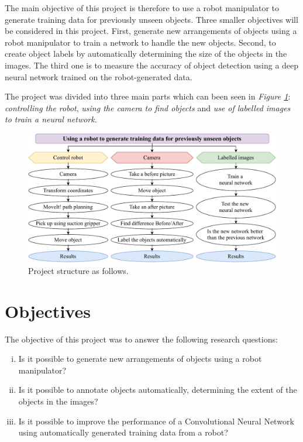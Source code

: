 The main objective of this project is therefore to use a robot manipulator to generate training data for previously unseen objects. 
Three smaller objectives will be considered in this project. 
First, generate new arrangements of objects using a robot manipulator to train a network to handle the new objects. 
Second, to create object labels by automatically determining the size of the objects in the images.
The third one is to measure the accuracy of object detection using a deep neural network trained on the robot-generated data.

The project was divided into three main parts which can been seen in \textit{Figure \ref{fig:project}}: \textit{controlling the robot}, \textit{using the camera to find objects} and \textit{use of labelled images to train a neural network}. 
\begin{figure}[h]
 \centering
 \includegraphics[width=1\textwidth]{graphics/meis.pdf}
 \caption{Project structure as follows.}
 \label{fig:project}
\end{figure}


\section{Objectives}
The objective of this project was to answer the following research questions:
\begin{enumerate}[i.]
  \item Is it possible to generate new arrangements of objects using a robot manipulator?
  \item Is it possible to annotate objects automatically, determining the extent of the objects in the images?
  \item Is it possible to improve the performance of a Convolutional Neural Network using automatically generated training data from a robot? %
\end{enumerate}
\clearpage


